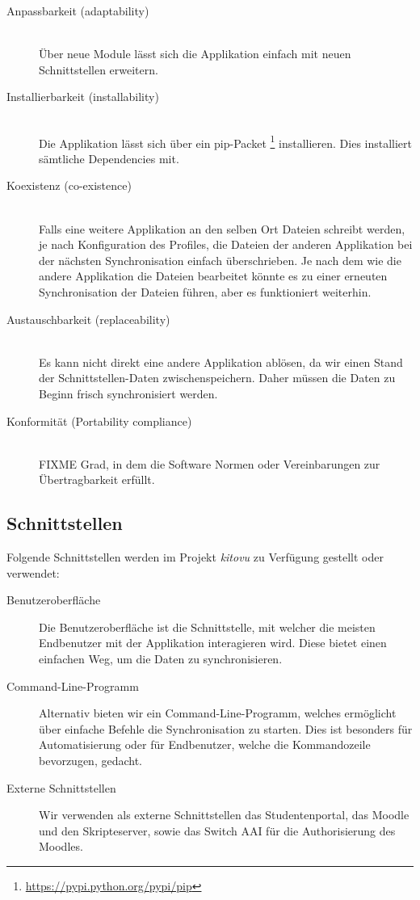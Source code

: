\documentclass[a4paper]{article}
\begin{document}
\begin{description}
  \item[Anpassbarkeit (adaptability)] \strut \\
    Über neue Module lässt sich die Applikation einfach mit neuen Schnittstellen erweitern.
  \item[Installierbarkeit (installability)] \strut \\
    Die Applikation lässt sich über ein pip-Packet \footnote{\url{https://pypi.python.org/pypi/pip}} installieren.
    Dies installiert sämtliche Dependencies mit.
  \item[Koexistenz (co-existence)] \strut \\
    Falls eine weitere Applikation an den selben Ort Dateien schreibt werden, je nach Konfiguration des Profiles, die Dateien der anderen Applikation bei der nächsten Synchronisation einfach überschrieben.
    Je nach dem wie die andere Applikation die Dateien bearbeitet könnte es zu einer erneuten Synchronisation der Dateien führen, aber es funktioniert weiterhin.
  \item[Austauschbarkeit (replaceability)] \strut \\
    Es kann nicht direkt eine andere Applikation ablösen, da wir einen Stand der Schnittstellen-Daten zwischenspeichern.
    Daher müssen die Daten zu Beginn frisch synchronisiert werden.
  \item[Konformität (Portability compliance)] \strut \\
    FIXME Grad, in dem die Software Normen oder Vereinbarungen zur Übertragbarkeit erfüllt.
\end{description}

\subsection{Schnittstellen}

Folgende Schnittstellen werden im Projekt \emph{kitovu} zu Verfügung gestellt oder verwendet:

\begin{description}
  \item[Benutzeroberfläche]
    Die Benutzeroberfläche ist die Schnittstelle, mit welcher die meisten Endbenutzer mit der Applikation interagieren wird.
    Diese bietet einen einfachen Weg, um die Daten zu synchronisieren.
  \item[Command-Line-Programm]
    Alternativ bieten wir ein Command-Line-Programm, welches ermöglicht über einfache Befehle die Synchronisation zu starten.
    Dies ist besonders für Automatisierung oder für Endbenutzer, welche die Kommandozeile bevorzugen, gedacht.
  \item[Externe Schnittstellen]
    Wir verwenden als externe Schnittstellen das Studentenportal, das Moodle und den Skripteserver, sowie das Switch AAI für die Authorisierung des Moodles.
\end{description}
\end{document}
